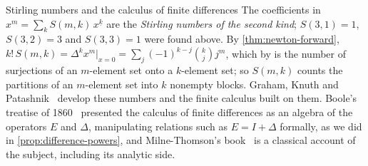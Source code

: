 \begin{table}
\end{table}

\begin{note}{Stirling numbers and the calculus of finite differences}
The coefficients in $x^m=\sum_kS(m,k)\,x^{\underline k}$ are the \emph{Stirling numbers of the second kind}; $S(3,1)=1$, $S(3,2)=3$ and $S(3,3)=1$ were found above. By \cref{thm:newton-forward}, $k!\,S(m,k)=\Delta^kx^m|_{x=0}=\sum_j(-1)^{k-j}\binom kjj^m$, which by  is the number of surjections of an $m$-element set onto a $k$-element set; so $S(m,k)$ counts the partitions of an $m$-element set into $k$ nonempty blocks. Graham, Knuth and Patashnik~\cite[Sects.~2.6 and~6.1]{graham1994concrete} develop these numbers and the finite calculus built on them. Boole's treatise of 1860~\cite{boole1860} presented the calculus of finite differences as an algebra of the operators $E$ and $\Delta$, manipulating relations such as $E=I+\Delta$ formally, as we did in \cref{prop:difference-powers}, and Milne-Thomson's book~\cite{milnethomson1933} is a classical account of the subject, including its analytic side.
\end{note}


